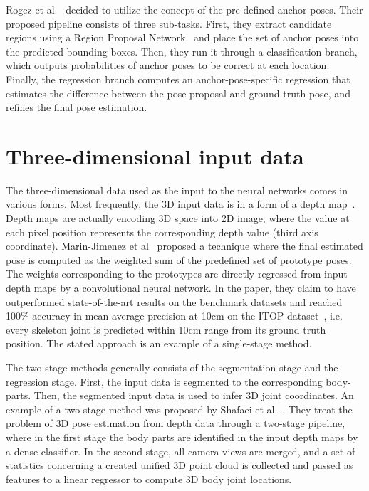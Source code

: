 \vspace{5mm}
\noindent
Rogez et al.~\cite{lcrnet} decided to utilize the concept of the pre-defined anchor poses. Their proposed pipeline consists of three sub-tasks. First, they extract candidate regions using a Region Proposal Network~\cite{NIPS2015_5638} and place the set of anchor poses into the predicted bounding boxes. Then, they run it through a classification branch, which outputs probabilities of anchor poses to be correct at each location. Finally, the regression branch computes an anchor-pose-specific regression that estimates the difference between the pose proposal and ground truth pose, and refines the final pose estimation. 

\section{Three-dimensional input data}
\noindent The three-dimensional data used as the input to the neural networks comes in various forms. Most frequently, the 3D input data is in a form of a depth map~\cite{Malik2018StructureAware3H,Marin18jvcir,inproceedings,Xiong_2019_ICCV}. Depth maps are actually encoding 3D space into 2D image, where the value at each pixel position represents the corresponding depth value (third axis coordinate). Marin-Jimenez et al~\cite{Marin18jvcir} proposed a technique where the final estimated pose is computed as the weighted sum of the predefined set of prototype poses. The weights corresponding to the prototypes are directly regressed from input depth maps by a convolutional neural network. In the paper, they claim to have outperformed state-of-the-art results on the benchmark datasets and reached 100\% accuracy in mean average precision at 10cm on the ITOP dataset~\cite{haque2016viewpoint}, i.e. every skeleton joint is predicted within 10cm range from its ground truth position. The stated approach is an example of a single-stage method.\par
\vspace{5mm}
\noindent The two-stage methods generally consists of the segmentation stage and the regression stage. First, the input data is segmented to the corresponding body-parts. Then, the segmented input data is used to infer 3D joint coordinates. An example of a two-stage method was proposed by Shafaei et al.~\cite{Shafaei16}. They treat the problem of 3D pose estimation from depth data through a two-stage pipeline, where in the first stage the body parts are identified in the input depth maps by a dense classifier. In the second stage, all camera views are merged, and a set of statistics concerning a created unified 3D point cloud is collected and passed as features to a linear regressor to compute 3D body joint locations.\par
